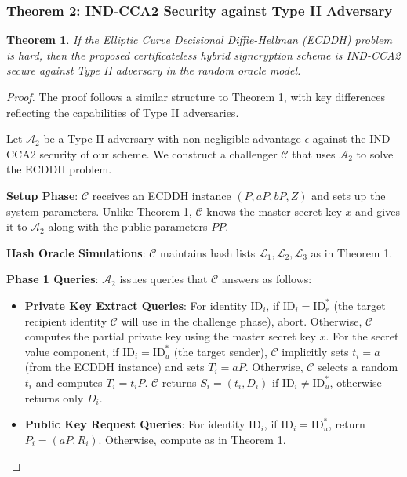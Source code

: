 \documentclass[10pt]{article}
\newtheorem{theorem}{Theorem}
\newtheorem{proof}{Proof}
\begin{document}
\subsubsection{Theorem 2: IND-CCA2 Security against Type II Adversary}

\begin{theorem}
If the Elliptic Curve Decisional Diffie-Hellman (ECDDH) problem is hard, then the proposed certificateless hybrid signcryption scheme is IND-CCA2 secure against Type II adversary in the random oracle model.
\end{theorem}

\begin{proof}
The proof follows a similar structure to Theorem 1, with key differences reflecting the capabilities of Type II adversaries.

Let $\mathcal{A}_2$ be a Type II adversary with non-negligible advantage $\epsilon$ against the IND-CCA2 security of our scheme. We construct a challenger $\mathcal{C}$ that uses $\mathcal{A}_2$ to solve the ECDDH problem.

\textbf{Setup Phase}:
$\mathcal{C}$ receives an ECDDH instance $(P, aP, bP, Z)$ and sets up the system parameters. Unlike Theorem 1, $\mathcal{C}$ knows the master secret key $x$ and gives it to $\mathcal{A}_2$ along with the public parameters $PP$.

\textbf{Hash Oracle Simulations}:
$\mathcal{C}$ maintains hash lists $\mathcal{L}_1, \mathcal{L}_2, \mathcal{L}_3$ as in Theorem 1.

\textbf{Phase 1 Queries}:
$\mathcal{A}_2$ issues queries that $\mathcal{C}$ answers as follows:

\begin{itemize}
    \item \textbf{Private Key Extract Queries}: For identity $\text{ID}_i$, if $\text{ID}_i = \text{ID}_r^*$ (the target recipient identity $\mathcal{C}$ will use in the challenge phase), abort. Otherwise, $\mathcal{C}$ computes the partial private key using the master secret key $x$. For the secret value component, if $\text{ID}_i = \text{ID}_u^*$ (the target sender), $\mathcal{C}$ implicitly sets $t_i = a$ (from the ECDDH instance) and sets $T_i = aP$. Otherwise, $\mathcal{C}$ selects a random $t_i$ and computes $T_i = t_i P$. $\mathcal{C}$ returns $S_i = (t_i, D_i)$ if $\text{ID}_i \neq \text{ID}_u^*$, otherwise returns only $D_i$.
    
    \item \textbf{Public Key Request Queries}: For identity $\text{ID}_i$, if $\text{ID}_i = \text{ID}_u^*$, return $P_i = (aP, R_i)$. Otherwise, compute as in Theorem 1.
    

\end{itemize}
\end{proof}
\end{document}
